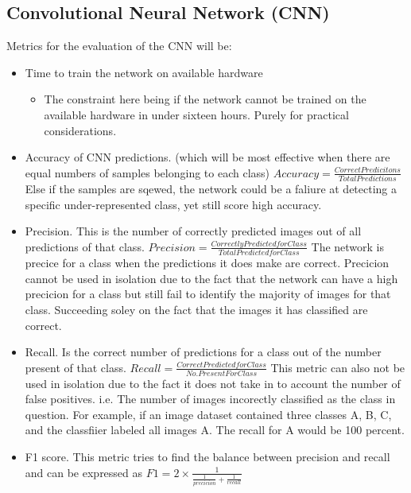   \subsection{Convolutional Neural Network (CNN)}
  Metrics for the evaluation of the CNN will be:
  \begin{itemize}
    \item Time to train the network on available hardware
    \begin{itemize}
      \item The constraint here being if the network cannot be trained on the available hardware in under sixteen hours. Purely for practical considerations.
    \end{itemize}
    \item Accuracy of CNN predictions. (which will be most effective when there are equal numbers of samples belonging to each class) $Accuracy = \frac{Correct Predicitons}{Total Predictions}$ Else if the samples are sqewed, the network could be a faliure at detecting a specific under-represented class, yet still score high accuracy.
    \item Precision. This is the number of correctly predicted images out of all predictions of that class. $Precision = \frac{Correctly Predicted for Class}{Total Predicted for Class}$ The network is precice for a class when the predictions it does make are correct. Precicion cannot be used in isolation due to the fact that the network can have a high precicion for a class but still fail to identify the majority of images for that class. Succeeding soley on the fact that the images it has classified are correct.
    \item Recall. Is the correct number of predictions for a class out of the number present of that class. $Recall = \frac{Correct Predicted for Class}{No. Present For Class}$
    This metric can also not be used in isolation due to the fact it does not take in to account the number of false positives. i.e. The number of images incorectly classified as the class in question. For example, if an image dataset contained three classes A, B, C, and the classfiier labeled all images A. The recall for A would be 100 percent.
    \item F1 score. This metric tries to find the balance between precision and recall and can be expressed as $F1 = 2 \times \frac{1}{\frac{1}{precicion} + \frac{1}{recall}}$
  \end{itemize}
